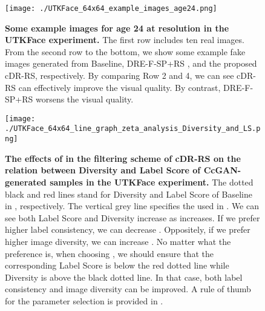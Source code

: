 \documentclass[final,12pt, 3p,times]{elsarticle}
\begin{document}
\begin{figure}[htbp]
	\centering
	\texttt{[image: ./UTKFace\_64x64\_example\_images\_age24.png]}  \caption{\textbf{Some example images for age 24 at  resolution in the UTKFace experiment.} The first row includes ten real images. From the second row to the bottom, we show some example fake images generated from Baseline, DRE-F-SP+RS \cite{ding2020subsampling}, and the proposed cDR-RS, respectively. By comparing Row 2 and 4, we can see cDR-RS can effectively improve the visual quality. By contrast, DRE-F-SP+RS worsens the visual quality.}
	\label{fig:UTKFace_example_images}
\end{figure}

\begin{figure}[htbp]
	\centering
	\texttt{[image: ./UTKFace\_64x64\_line\_graph\_zeta\_analysis\_Diversity\_and\_LS.png]}  \caption{\textbf{The effects of  in the filtering scheme of cDR-RS on the relation between Diversity and Label Score of CcGAN-generated samples in the UTKFace experiment.} The dotted black and red lines stand for Diversity and Label Score of Baseline in , respectively. The vertical grey line specifies the  used in . We can see both Label Score and Diversity increase as  increases. If we prefer higher label consistency, we can decrease . Oppositely, if we prefer higher image diversity, we can increase . No matter what the preference is, when choosing , we should ensure that the corresponding Label Score is below the red dotted line while Diversity is above the black dotted line. In that case, both label consistency and image diversity can be improved. A rule of thumb for the parameter selection is provided in .}
	\label{fig:UTKFace_effect_of_kappa}
\end{figure}
\end{document}
